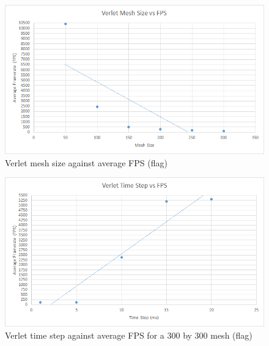     \begin{figure}
    \begin{center}
      \includegraphics[scale=.9]{Figures/flag_v_m_fps}
    \end{center}
    \caption{Verlet mesh size against average FPS (flag)}
    \label{fig:v mesh fps flag}
  \end{figure}
  
    \begin{figure}
    \begin{center}
      \includegraphics[scale=.9]{Figures/flag_v_ts_fps}
    \end{center}
    \caption{Verlet time step against average FPS for a 300 by 300 mesh (flag)}
    \label{fig:v step fps flag}
  \end{figure}
  
